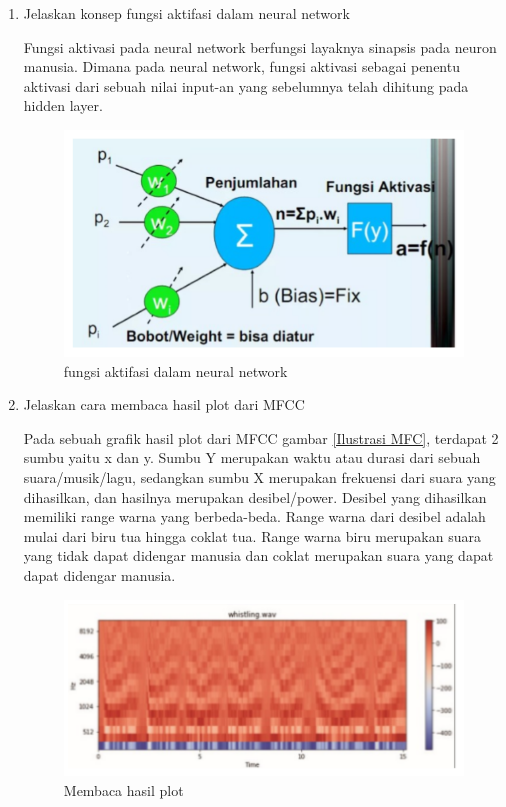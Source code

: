 \begin{enumerate}
\item Jelaskan konsep fungsi aktifasi dalam neural network
\par Fungsi aktivasi pada neural network berfungsi layaknya sinapsis pada neuron manusia. Dimana pada neural network, fungsi aktivasi sebagai penentu aktivasi dari sebuah nilai input-an yang sebelumnya telah dihitung pada hidden layer. 
\begin{figure}[H]
\centering
\includegraphics[scale=0.4]{figures/1174057/chapter6/4.PNG}
\caption{fungsi aktifasi dalam neural network}
\label{fungsi aktifasi dalam neural network}
\end{figure}	

\item Jelaskan cara membaca hasil plot dari MFCC
\par Pada sebuah graﬁk hasil plot dari MFCC gambar \ref{Ilustrasi MFC}, terdapat 2 sumbu yaitu x dan y. Sumbu Y merupakan waktu atau durasi dari sebuah suara/musik/lagu, sedangkan sumbu X merupakan frekuensi dari suara yang dihasilkan, dan hasilnya merupakan desibel/power. Desibel yang dihasilkan memiliki range warna yang berbeda-beda. Range warna dari desibel adalah mulai dari biru tua hingga coklat tua. Range warna biru merupakan suara yang tidak dapat didengar manusia dan coklat merupakan suara yang dapat dapat didengar manusia.
\begin{figure}[H]
\centering
\includegraphics[scale=0.4]{figures/1174057/chapter6/5.PNG}
\caption{Membaca hasil plot}
\label{Membaca hasil plot}
\end{figure}


\end{enumerate}

